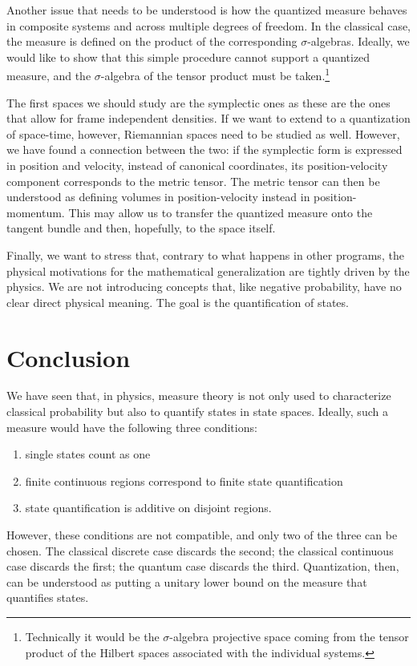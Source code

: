 \documentclass[10pt,twocolumn, nofootinbib]{revtex4-2}
\begin{document}
Another issue that needs to be understood is how the quantized measure behaves in composite systems and across multiple degrees of freedom. In the classical case, the measure is defined on the product of the corresponding $\sigma$-algebras. Ideally, we would like to show that this simple procedure cannot support a quantized measure, and the $\sigma$-algebra of the tensor product must be taken.\footnote{Technically it would be the $\sigma$-algebra projective space coming from the tensor product of the Hilbert spaces associated with the individual systems.}

The first spaces we should study are the symplectic ones as these are the ones that allow for frame independent densities. If we want to extend to a quantization of space-time, however, Riemannian spaces need to be studied as well. However, we have found a connection between the two: if the symplectic form is expressed in position and velocity, instead of canonical coordinates, its position-velocity component corresponds to the metric tensor. The metric tensor can then be understood as defining volumes in position-velocity instead in position-momentum. This may allow us to transfer the quantized measure onto the tangent bundle and then, hopefully, to the space itself.

Finally, we want to stress that, contrary to what happens in other programs, the physical motivations for the mathematical generalization are tightly driven by the physics. We are not introducing concepts that, like negative probability, have no clear direct physical meaning. The goal is the quantification of states.

\section{Conclusion}

We have seen that, in physics, measure theory is not only used to characterize classical probability but also to quantify states in state spaces. Ideally, such a measure would have the following three conditions:
\begin{enumerate}
	\item single states count as one
	\item finite continuous regions correspond to finite state quantification
	\item state quantification is additive on disjoint regions.
\end{enumerate}
However, these conditions are not compatible, and only two of the three can be chosen. The classical discrete case discards the second; the classical continuous case discards the first; the quantum case discards the third. Quantization, then, can be understood as putting a unitary lower bound on the measure that quantifies states.
\end{document}
